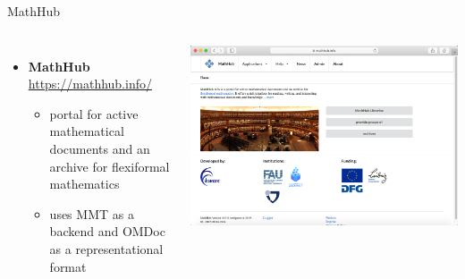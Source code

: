 \documentclass{beamer}
\begin{document}
    \begin{frame}{MathHub}
        \begin{columns}
            \begin{itemize}
                \item \textbf{MathHub} \url{https://mathhub.info/}
                \begin{itemize}
                    \item portal for active mathematical documents and an archive for flexiformal mathematics
                    \item uses MMT as a backend and OMDoc as a representational format
                \end{itemize}
            \end{itemize}
            \includegraphics[scale=0.15]{images/mathhub}
        \end{columns}
    \end{frame}
\end{document}
